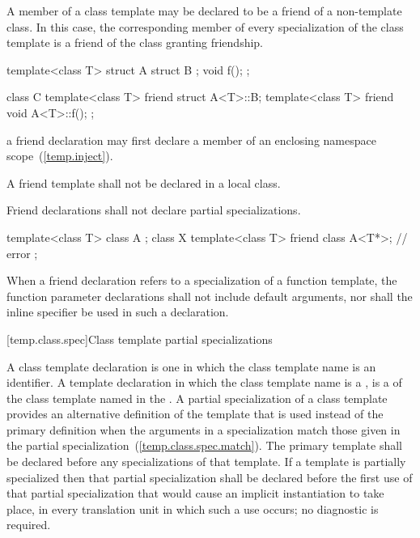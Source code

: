 \pnum
A member of a class template may be declared to be a friend of a
non-template class.
In this case, the corresponding member of every specialization of
the class template is a friend of the class granting friendship.
\enterexample

\begin{codeblock}
template<class T> struct A {
	struct B { };
	void f();
};

class C {
	template<class T> friend struct A<T>::B;
	template<class T> friend void A<T>::f();
};
\end{codeblock}
\exitexampleb

\pnum
\enternote
a friend declaration may first declare a member of an enclosing namespace scope~(\ref{temp.inject}).
\exitnote

\pnum
A friend template shall not be declared in a local class.

\pnum
Friend declarations shall not declare partial specializations.
\enterexample

\begin{codeblock}
template<class T> class A { };
class X {
	template<class T> friend class A<T*>;	// error
};
\end{codeblock}
\exitexampleb

\pnum
When a friend declaration refers to a specialization of a function
template, the function parameter declarations shall not include
default arguments, nor shall the inline specifier be used in such a
declaration.

[temp.class.spec]{Class template partial specializations}

\pnum
{}%
%
A
class template declaration is one in which the class template name is an
identifier.
A template declaration in which the class template name is a
,
is a
of the class template named in the
.
A partial specialization of a class template provides an alternative definition
of the template that is used instead of the primary definition when the
arguments in a specialization match those given in the partial
specialization~(\ref{temp.class.spec.match}).
The primary template shall be declared before any specializations of
that template. If a template is partially specialized then that
partial specialization shall be declared before the first use of that partial
specialization that would cause an implicit instantiation to take place,
in every translation unit in which such a use
occurs; no diagnostic is required.

